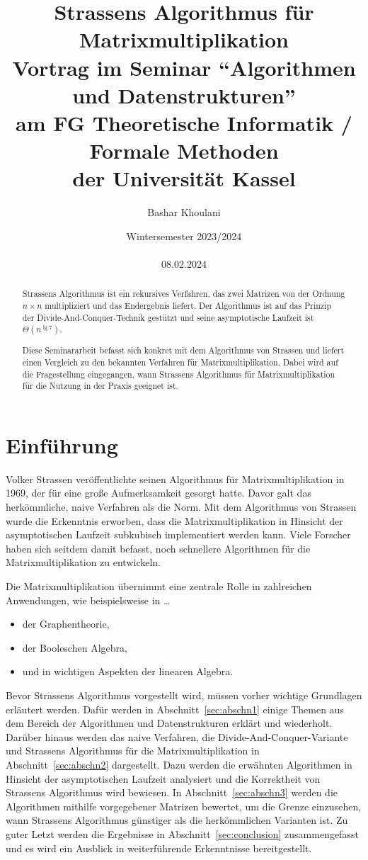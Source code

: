 \documentclass[11pt]{article}
\title{Strassens Algorithmus für Matrixmultiplikation \\[3 mm] \large Vortrag im Seminar \enquote{Algorithmen und Datenstrukturen} \\ am FG Theoretische Informatik / Formale Methoden \\ der Universit\"at Kassel}
\author{Bashar Khoulani}
\date{Wintersemester 2023/2024 \\ \phantom{a} \\ 08.02.2024}
\numberwithin{equation}{section}
\begin{document}
\maketitle

\begin{abstract}
Strassens Algorithmus ist ein rekursives Verfahren, das zwei Matrizen von der Ordnung $n \times n$ multipliziert und das Endergebnis liefert. 
Der Algorithmus ist auf das Prinzip der Divide-And-Conquer-Technik gestützt und seine asymptotische Laufzeit ist $\Theta(n^{\lg7})$.

Diese Seminararbeit befasst sich konkret mit dem Algorithmus von Strassen und liefert einen Vergleich zu den bekannten Verfahren für Matrixmultiplikation.
Dabei wird auf die Fragestellung eingegangen, wann Strassens Algorithmus für Matrixmultiplikation für die Nutzung in der Praxis geeignet ist.
\end{abstract}

\section{Einführung}\label{sec:einfuhrung}

Volker Strassen veröffentlichte seinen Algorithmus für Matrixmultiplikation in 1969\cite{Strassen1969}, der für eine große Aufmerksamkeit gesorgt hatte.
Davor galt das herkömmliche, naive Verfahren als die Norm.
Mit dem Algorithmus von Strassen wurde die Erkenntnis erworben, dass die Matrixmultiplikation in Hinsicht der asymptotischen Laufzeit subkubisch implementiert werden kann.
Viele Forscher haben sich seitdem damit befasst, noch schnellere Algorithmen für die Matrixmultiplikation zu entwickeln. 

Die Matrixmultiplikation übernimmt eine zentrale Rolle in zahlreichen Anwendungen,
wie beispielsweise in \ldots 
\begin{itemize}
    \item der Graphentheorie,
    \item der Booleschen Algebra,
    \item und in wichtigen Aspekten der linearen Algebra\cite{1984}.
\end{itemize}

Bevor Strassens Algorithmus vorgestellt wird, müssen vorher wichtige Grundlagen erläutert werden.
Dafür werden in Abschnitt~\ref{sec:abschn1} einige Themen aus dem Bereich der Algorithmen und Datenstrukturen erklärt und wiederholt.
Darüber hinaus werden das naive Verfahren, die Divide-And-Conquer-Variante und Strassens Algorithmus für die Matrixmultiplikation in Abschnitt~\ref{sec:abschn2} dargestellt.
Dazu werden die erwähnten Algorithmen in Hinsicht der asymptotischen Laufzeit analysiert und die Korrektheit von Strassens Algorithmus wird bewiesen.
In Abschnitt~\ref{sec:abschn3} werden die Algorithmen mithilfe vorgegebener Matrizen bewertet, um die Grenze einzusehen, wann Strassens Algorithmus günstiger als die herkömmlichen Varianten ist.
Zu guter Letzt werden die Ergebnisse in Abschnitt~\ref{sec:conclusion} zusammengefasst und es wird ein Ausblick in weiterführende Erkenntnisse bereitgestellt.
 
\end{document}
